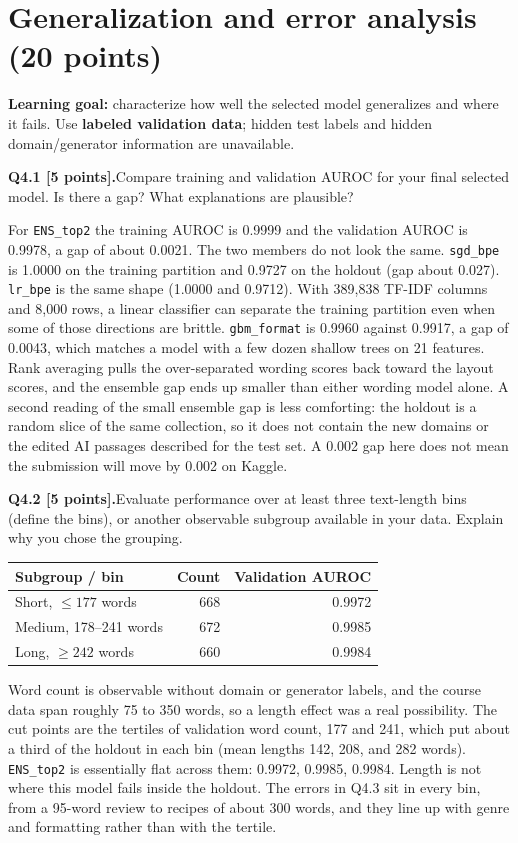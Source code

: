 \documentclass[11pt,letterpaper]{article}
\newcommand{\question}[2]{\needspace{4\baselineskip}\par\addvspace{0.45em}\noindent\textbf{#1}\quad #2\par\nobreak\vspace{0.1em}}
\begin{document}
\newpage
\section{Generalization and error analysis (20 points)}
\textbf{Learning goal:} characterize how well the selected model generalizes and where it fails. Use \textbf{labeled validation data}; hidden test labels and hidden domain/generator information are unavailable.

\question{Q4.1 [5 points].}{Compare training and validation AUROC for your final selected model. Is there a gap? What explanations are plausible?}

For \texttt{ENS\_top2} the training AUROC is 0.9999 and the validation AUROC is 0.9978, a gap of about 0.0021. The two members do not look the same. \texttt{sgd\_bpe} is 1.0000 on the training partition and 0.9727 on the holdout (gap about 0.027). \texttt{lr\_bpe} is the same shape (1.0000 and 0.9712). With 389{,}838 TF-IDF columns and 8{,}000 rows, a linear classifier can separate the training partition even when some of those directions are brittle. \texttt{gbm\_format} is 0.9960 against 0.9917, a gap of 0.0043, which matches a model with a few dozen shallow trees on 21 features. Rank averaging pulls the over-separated wording scores back toward the layout scores, and the ensemble gap ends up smaller than either wording model alone. A second reading of the small ensemble gap is less comforting: the holdout is a random slice of the same collection, so it does not contain the new domains or the edited AI passages described for the test set. A 0.002 gap here does not mean the submission will move by 0.002 on Kaggle.

\question{Q4.2 [5 points].}{Evaluate performance over at least three text-length bins (define the bins), or another observable subgroup available in your data. Explain why you chose the grouping.}
\begin{tabularx}{\linewidth}{@{}Yrr@{}}\toprule Subgroup / bin & Count & Validation AUROC \\ \midrule
Short, $\le 177$ words & 668 & 0.9972 \\
Medium, 178--241 words & 672 & 0.9985 \\
Long, $\ge 242$ words & 660 & 0.9984 \\
\bottomrule\end{tabularx}

Word count is observable without domain or generator labels, and the course data span roughly 75 to 350 words, so a length effect was a real possibility. The cut points are the tertiles of validation word count, 177 and 241, which put about a third of the holdout in each bin (mean lengths 142, 208, and 282 words). \texttt{ENS\_top2} is essentially flat across them: 0.9972, 0.9985, 0.9984. Length is not where this model fails inside the holdout. The errors in Q4.3 sit in every bin, from a 95-word review to recipes of about 300 words, and they line up with genre and formatting rather than with the tertile.
\end{document}
